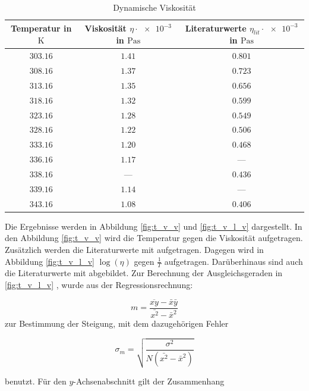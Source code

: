 \begin{table}
\centering
\begin{tabular} {ccc}
  \toprule
  Temperatur in $\si{\kelvin}$ & Viskosität $\eta\cdot\num{e-3}$ in $\si{\pascal\second}$ & Literaturwerte $\eta_{lit}\cdot\num{e-3}$ in $\si{\pascal\second}$  \\
  \midrule
  $\num{303.16}$ & $\num{1.41}$ & $\num{0.801}$  \\
  $\num{308.16}$ & $\num{1.37}$ & $\num{0.723}$  \\
  $\num{313.16}$ & $\num{1.35}$& $\num{0.656}$  \\
  $\num{318.16}$ & $\num{1.32}$ & $\num{0.599}$\\
  $\num{323.16}$ & $\num{1.28}$& $\num{0.549}$ \\
  $\num{328.16}$ & $\num{1.22}$& $\num{0.506}$ \\
  $\num{333.16}$ & $\num{1.20}$& $\num{0.468}$ \\
  $\num{336.16}$ & $\num{1.17}$&  --- \\
  $\num{338.16}$ & --- & $\num{0.436}$ \\
  $\num{339.16}$ & $\num{1.14}$&  --- \\
  $\num{343.16}$ & $\num{1.08}$& $\num{0.406}$ \\
\bottomrule
\end{tabular}
\caption{Dynamische Viskosität} %
\label{tab:visko_wasser_temp}
\end{table}

Die Ergebnisse werden in Abbildung \ref{fig:t_v_v} und \ref{fig:t_v_l_v} dargestellt.
In den Abbildung \ref{fig:t_v_v} wird die Temperatur gegen die Viskosität aufgetragen.
Zusätzlich werden die Literaturwerte \cite{lit_dichte} mit aufgetragen.
Dagegen wird in Abbildung \ref{fig:t_v_l_v} $\log(\eta)$ gegen $\frac{1}{T}$ aufgetragen.
Darüberhinaus sind auch die Literaturwerte \cite{lit_dichte} mit abgebildet.
Zur Berechnung der Ausgleichsgeraden in \ref{fig:t_v_l_v} , wurde aus der Regressionsrechnung:

\begin{equation*}
m=\frac{\overline{xy}-\bar{x}\bar{y}}{\bar{x^2}-\bar{x}^2}
\end{equation*}
zur Bestimmung der Steigung, mit dem dazugehörigen Fehler

\begin{equation*}
\sigma_m=\sqrt{\frac{\sigma^2}{N(\bar{x^2}-\bar{x}^2)}}
\end{equation*}

benutzt.
Für den $y$-Achsenabschnitt gilt der Zusammenhang

